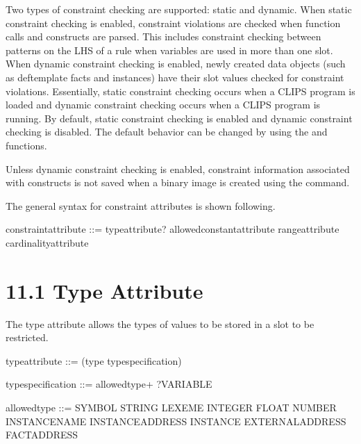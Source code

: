 \documentclass[letterpaper,10pt,english]{sphinxmanual}
\begin{document}
Two types of constraint checking are supported: static and dynamic. When
static constraint checking is enabled, constraint violations are checked
when function calls and constructs are parsed. This includes constraint
checking between patterns on the LHS of a rule when variables are used
in more than one slot. When dynamic constraint checking is enabled,
newly created data objects (such as deftemplate facts and instances)
have their slot values checked for constraint violations. Essentially,
static constraint checking occurs when a CLIPS program is loaded and
dynamic constraint checking occurs when a CLIPS program is running. By
default, static constraint checking is enabled and dynamic constraint
checking is disabled. The default behavior can be changed by using the
 and
 functions.

Unless dynamic constraint checking is enabled, constraint information
associated with constructs is not saved when a binary image is created
using the  command.

The general syntax for constraint attributes is shown following.


\begin{sphinxVerbatim}[commandchars=\\\{\}]
\PYGZlt{}constraint\PYGZhy{}attribute\PYGZgt{} ::= \PYGZlt{}type\PYGZhy{}attribute\PYGZgt{}?\textbar{}
  \PYGZlt{}allowed\PYGZhy{}constant\PYGZhy{}attribute\PYGZgt{} \textbar{}
  \PYGZlt{}range\PYGZhy{}attribute\PYGZgt{} \textbar{}
  \PYGZlt{}cardinality\PYGZhy{}attribute\PYGZgt{}
\end{sphinxVerbatim}


\section{11.1 Type Attribute}
\label{\detokenize{constraints:type-attribute}}
The type attribute allows the types of values to be stored in a slot to
be restricted.


\begin{sphinxVerbatim}[commandchars=\\\{\}]
\PYGZlt{}type\PYGZhy{}attribute\PYGZgt{} ::= (type \PYGZlt{}type\PYGZhy{}specification\PYGZgt{})

\PYGZlt{}type\PYGZhy{}specification\PYGZgt{} ::= \PYGZlt{}allowed\PYGZhy{}type\PYGZgt{}+ \textbar{} ?VARIABLE

\PYGZlt{}allowed\PYGZhy{}type\PYGZgt{} ::= SYMBOL \textbar{} STRING \textbar{} LEXEME \textbar{}
  INTEGER \textbar{} FLOAT \textbar{} NUMBER \textbar{}
  INSTANCE\PYGZhy{}NAME \textbar{} INSTANCE\PYGZhy{}ADDRESS \textbar{} INSTANCE \textbar{}
  EXTERNAL\PYGZhy{}ADDRESS \textbar{} FACT\PYGZhy{}ADDRESS
\end{sphinxVerbatim}
\end{document}
